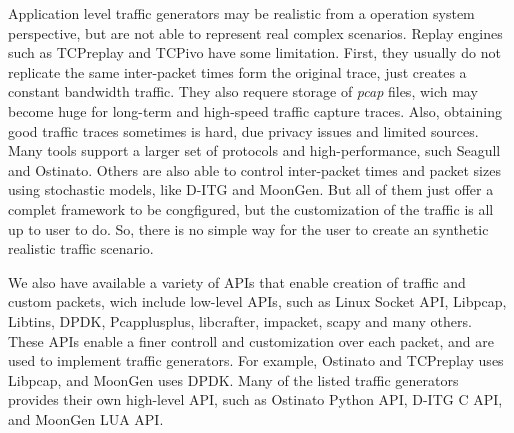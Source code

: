 Application level traffic generators may be realistic from a operation system perspective, but are not able to represent real complex scenarios. Replay engines such as  TCPreplay and TCPivo have some limitation. First, they usually do not replicate the same inter-packet times form the original trace, just creates a constant bandwidth traffic. They also requere storage of \textit{pcap} files, wich may become huge for  long-term and high-speed traffic capture traces. Also, obtaining good traffic traces sometimes is hard, due privacy issues and limited sources.  Many tools support a larger set of protocols and high-performance, such Seagull and Ostinato. Others are also able to control inter-packet times and packet sizes using stochastic models, like D-ITG\cite{ditg-paper} and MoonGen\cite{moongen-paper}. But all of them just offer a complet framework to be congfigured, but the customization of the traffic is all up to user to do. So, there is no simple way for the user to create an synthetic realistic traffic scenario. 


We also have available a variety of APIs that enable creation of traffic and custom packets, wich include low-level APIs, such as Linux Socket API,  Libpcap, Libtins, DPDK, Pcapplusplus, libcrafter, impacket, scapy and many others. These APIs enable a finer controll and customization over each packet, and are used to implement traffic generators. For example, Ostinato and TCPreplay uses Libpcap, and MoonGen uses DPDK. Many of the listed traffic generators provides their own high-level API, such as Ostinato Python API, D-ITG C API, and MoonGen LUA API. 


